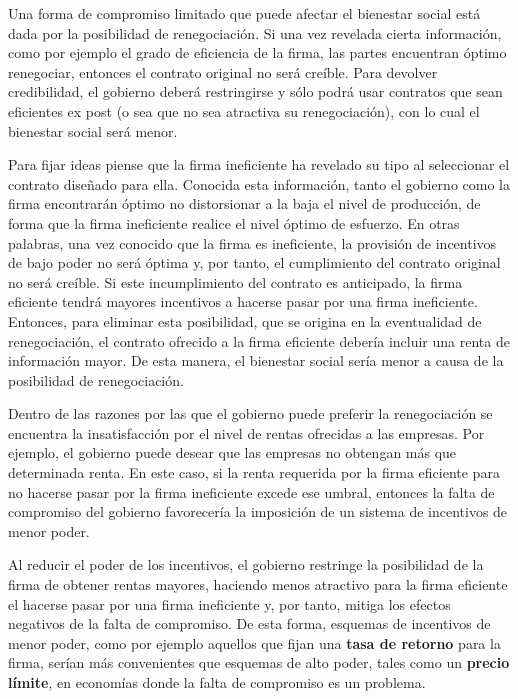 \documentclass[
  12pt,
  spanish,
]{book}
\begin{document}
Una forma de compromiso limitado que puede afectar el bienestar social está dada por la posibilidad de renegociación. Si una vez revelada cierta información, como por ejemplo el grado de eficiencia de la firma, las partes encuentran óptimo renegociar, entonces el contrato original no será creíble. Para devolver credibilidad, el gobierno deberá restringirse y sólo podrá usar contratos que sean eficientes ex post (o sea que no sea atractiva su renegociación), con lo cual el bienestar social será menor.

Para fijar ideas piense que la firma ineficiente ha revelado su tipo al seleccionar el contrato diseñado para ella. Conocida esta información, tanto el gobierno como la firma encontrarán óptimo no distorsionar a la baja el nivel de producción, de forma que la firma ineficiente realice el nivel óptimo de esfuerzo. En otras palabras, una vez conocido que la firma es ineficiente, la provisión de incentivos de bajo poder no será óptima y, por tanto, el cumplimiento del contrato original no será creíble. Si este incumplimiento del contrato es anticipado, la firma eficiente tendrá mayores incentivos a hacerse pasar por una firma ineficiente. Entonces, para eliminar esta posibilidad, que se origina en la eventualidad de renegociación, el contrato ofrecido a la firma eficiente debería incluir una renta de información mayor. De esta manera, el bienestar social sería menor a causa de la posibilidad de renegociación.

Dentro de las razones por las que el gobierno puede preferir la renegociación se encuentra la insatisfacción por el nivel de rentas ofrecidas a las empresas. Por ejemplo, el gobierno puede desear que las empresas no obtengan más que determinada renta. En este caso, si la renta requerida por la firma eficiente para no hacerse pasar por la firma ineficiente excede ese umbral, entonces la falta de compromiso del gobierno favorecería la imposición de un sistema de incentivos de menor poder.

Al reducir el poder de los incentivos, el gobierno restringe la posibilidad de la firma de obtener rentas mayores, haciendo menos atractivo para la firma eficiente el hacerse pasar por una firma ineficiente y, por tanto, mitiga los efectos negativos de la falta de compromiso. De esta forma, esquemas de incentivos de menor poder, como por ejemplo aquellos que fijan una \textbf{tasa de retorno} para la firma, serían más convenientes que esquemas de alto poder, tales como un \textbf{precio límite}, en economías donde la falta de compromiso es un problema.
\end{document}
